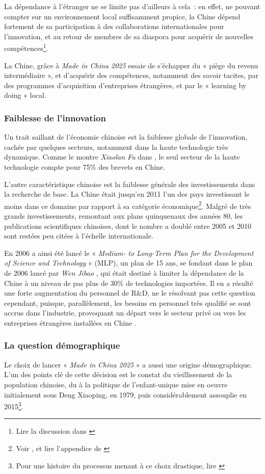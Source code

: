 \documentclass[a4paper]{article}
\begin{document}
La dépendance à l’étranger ne se limite pas d’ailleurs à cela~: en effet, ne pouvant compter sur un environnement local suffisamment propice, la Chine dépend fortement de sa participation à des collaborations internationales pour l’innovation, et au retour de membres de sa diaspora pour acquérir de nouvelles compétences\footnote{Lire la discussion dans \cite{xiaolan15_chinas}}.

La Chine, grâce à \textit{Made in China 2025} essaie de s’échapper du « piège du revenu intermédiaire », et d’acquérir des compétences, notamment des savoir tacites, par des programmes d’acquisition d’entreprises étrangères, et par le « learning by doing » local.

\subsubsection{Faiblesse de l’innovation}
\label{sec:orga58cd43}
Un trait saillant de l’économie chinoise est la faiblesse globale de l’innovation, cachée par quelques secteurs, notamment dans la haute technologie très dynamique. Comme le montre \textit{Xiaolan Fu} dans \cite{xiaolan15_chinas}, le seul secteur de la haute technologie compte pour 75\% des brevets en Chine.

L’autre caractéristique chinoise est la faiblesse générale des investissements dans la recherche de base. La Chine était jusqu’en 2011 l’un des pays investissant le moins dans ce domaine par rapport à sa catégorie économique\footnote{Voir \cite{xiaolan15_chinas}, et lire l’appendice de \cite{simon09_chinas}}. Malgré de très grands investissements, remontant aux plans quinquenaux des années 80, les publications scientifiques chinoises, dont le nombre a doublé entre 2005 et 2010 sont restées peu citées à l’échelle internationale.

En 2006 a ainsi été lancé le « \textit{Medium- to Long-Term Plan for the Development of Science and Technology} » (MLP), un plan de 15 ans, se fondant dans le plan de 2006 lancé par \textit{Wen Jibao} \cite{cao06_chinas_scien_techn_plan}, qui était destiné à limiter la dépendance de la Chine à un niveau de pas plus de 30\% de technologies importées. Il en a résulté une forte augmentation du personnel de R\&D, ne le résolvant pas cette question cependant, puisque, parallèlement, les besoins en personnel très qualifié se sont accrus dans l’industrie, provoquant un départ vers le secteur privé ou vers les entreprises étrangères installées en Chine \cite{simon09_chinas}.

\subsubsection{La question démographique}
\label{sec:org2d752fd}
Le choix de lancer « \textit{Made in China 2025} » a aussi une origine démographique.  L’un des points clé de cette décision est le constat du vieillissement de la population chinoise, du à la politique de l’enfant-unique mise en oeuvre initialement sous Deng Xiaoping, en 1979, puis considérablement assouplie en 2015\footnote{Pour une histoire du processus menant à ce choix drastique, lire \cite{greenhalgh08_just}}.
\end{document}
